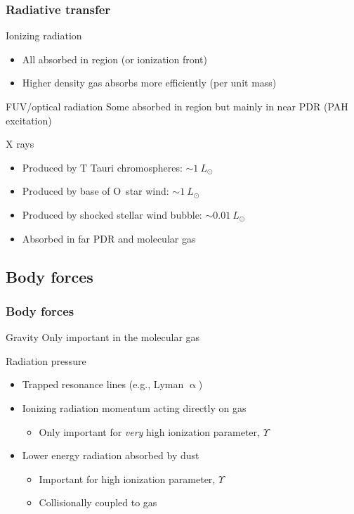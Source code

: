 \documentclass[presentation]{beamer}
\begin{document}
\begin{frame}
  \frametitle{Radiative transfer}
  \begin{block}{Ionizing radiation}
    \begin{itemize}
    \item All absorbed in \hii{} region (or ionization front)
    \item Higher density gas absorbs more efficiently (per unit mass)
    \end{itemize}
  \end{block}
  \begin{block}{FUV/optical radiation}
    Some absorbed in \hii{} region but mainly in near PDR (PAH excitation)
  \end{block}
  \begin{block}{X rays}
    \begin{itemize}
    \item Produced by T Tauri chromospheres: \(\sim 1~L_\odot\)
    \item Produced by base of O~star wind: \(\sim 1~L_\odot\)
    \item Produced by shocked stellar wind bubble: \(\sim 0.01~L_\odot\)
    \item Absorbed in far PDR and molecular gas
    \end{itemize} 
  \end{block}
\end{frame}

\subsection{Body forces}

\begin{frame}
  \frametitle{Body forces}
  \begin{block}{Gravity}
    Only important in the molecular gas
  \end{block}
  \begin{block}{Radiation pressure}
    \begin{itemize}
    \item Trapped resonance lines (e.g., Lyman \(\upalpha\))
    \item Ionizing radiation momentum acting directly on gas
      \begin{itemize}
      \item Only important for \emph{very} high ionization parameter, \(\Upsilon\)
      \end{itemize}
    \item \alert{Lower energy radiation absorbed by dust}
      \begin{itemize}
      \item Important for high ionization parameter, \(\Upsilon\)
      \item Collisionally coupled to gas
      \end{itemize}
    \end{itemize}
  \end{block}
\end{frame}
\end{document}
